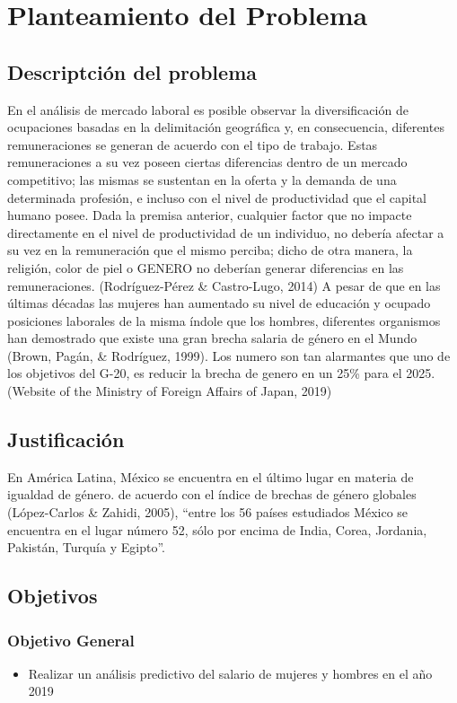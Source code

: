 \newpage
\section{Planteamiento del Problema}

\subsection{Descriptci\'on del problema}
En el an\'alisis de mercado laboral es posible observar la diversificaci\'on de ocupaciones basadas en la delimitaci\'on geogr\'afica y, en consecuencia, diferentes remuneraciones se generan de acuerdo con el tipo de trabajo. Estas remuneraciones a su vez poseen ciertas diferencias dentro de un mercado competitivo; las mismas se sustentan en la oferta y la demanda de una determinada profesi\'on, e incluso con el nivel de productividad que el capital humano posee. Dada la premisa anterior, cualquier factor que no impacte directamente en el nivel de productividad de un individuo, no deber\'ia afectar a su vez en la remuneraci\'on que el mismo perciba; dicho de otra manera, la religi\'on, color de piel o GENERO no deber\'ian generar diferencias en las remuneraciones. (Rodr\'iguez-P\'erez & Castro-Lugo, 2014)
A pesar de que en las \'ultimas d\'ecadas las mujeres han aumentado su nivel de educaci\'on y ocupado posiciones laborales de la misma \'indole que los hombres, diferentes organismos han demostrado que existe una gran brecha salaria de g\'enero en el Mundo (Brown, Pag\'an, & Rodr\'iguez, 1999). Los numero son tan alarmantes que uno de los objetivos del G-20, es reducir la brecha de genero en un 25\% para el 2025. (Website of the Ministry of Foreign Affairs of Japan, 2019)

\subsection{Justificaci\'on}
En Am\'erica Latina, M\'exico se encuentra en el \'ultimo lugar en materia de igualdad de g\'enero. de acuerdo con el \'indice de brechas de g\'enero globales (L\'opez-Carlos & Zahidi, 2005), “entre los 56 pa\'ises estudiados M\'exico se encuentra en el lugar n\'umero 52, s\'olo por encima de India, Corea, Jordania, Pakist\'an, Turqu\'ia y Egipto”.


\subsection{Objetivos}
\subsubsection{Objetivo General}
\begin{itemize}
    \item Realizar un an\'alisis predictivo del salario de mujeres y hombres en el año 2019
\end{itemize}
